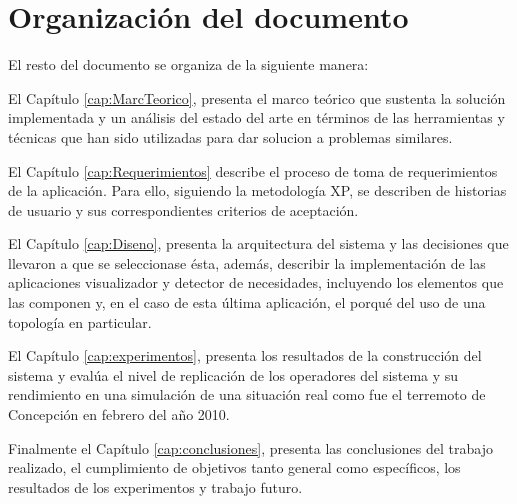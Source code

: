 \section{Organización del documento}
\label{intro:organizacion}

El resto del documento se organiza de la siguiente manera:

El Capítulo \ref{cap:MarcTeorico}, presenta el marco teórico que sustenta la solución implementada y un análisis del estado del arte en términos de las herramientas y técnicas que han sido utilizadas para dar solucion a problemas similares.

El Capítulo \ref{cap:Requerimientos} describe el proceso de toma de requerimientos de la aplicación. Para ello, siguiendo la metodología XP, se describen de historias de usuario y sus correspondientes criterios de aceptación.

El Capítulo \ref{cap:Diseno}, presenta la arquitectura del sistema y las decisiones que llevaron a que se seleccionase ésta, además, describir la implementación de las aplicaciones visualizador y detector de necesidades, incluyendo los elementos que las componen y, en el caso de esta última aplicación, el porqué del uso de una topología en particular.

El Capítulo \ref{cap:experimentos}, presenta los resultados de la construcción del sistema y evalúa el nivel de replicación de los operadores del sistema y su rendimiento en una simulación de una situación real como fue el terremoto de Concepción en febrero del año 2010.

Finalmente el Capítulo \ref{cap:conclusiones}, presenta las conclusiones del trabajo realizado, el cumplimiento de objetivos tanto general como específicos, los resultados de los experimentos y trabajo futuro.
